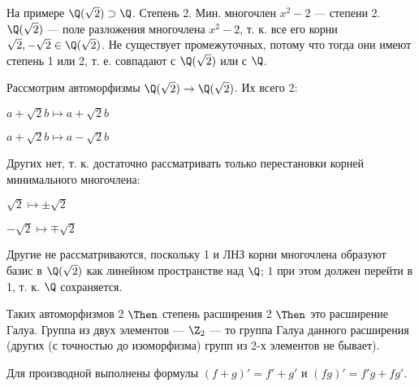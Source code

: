 \begin{solution}
На примере \(\Q(\sqrt{2}) \supset \Q\).
Степень 2. Мин. многочлен \(x^2-2\) --- степени 2.
\(\Q(\sqrt2)\) --- поле разложения многочлена \(x^2-2\), т. к. все его корни \(\sqrt2, -\sqrt2 \in \Q(\sqrt2)\).
Не существует промежуточных, потому что тогда они имеют степень 1 или 2, т. е. совпадают с \(\Q(\sqrt2)\) или с \(\Q\).

Рассмотрим автоморфизмы \(\Q(\sqrt2) \to \Q(\sqrt2)\). Их всего 2:

\(a+\sqrt2b \mapsto a+\sqrt2b\)

\(a+\sqrt2b \mapsto a-\sqrt2b\)

Других нет, т. к. достаточно рассматривать только перестановки корней минимального многочлена:

\(\sqrt2 \mapsto \pm \sqrt2\)

\(-\sqrt2 \mapsto \mp \sqrt2\)

Другие не рассматриваются, поскольку 1 и ЛНЗ корни многочлена образуют базис в \(\Q(\sqrt2)\) как линейном пространстве над \(\Q\); \(1\) при этом должен перейти в 1, т. к. \(\Q\) сохраняется.

Таких автоморфизмов 2 \(\Then\) степень расширения 2 \(\Then\) это расширение Галуа. Группа из двух элементов --- \(\Z_2\) --- то группа Галуа данного расширения (других (с точностью до изоморфизма) групп из 2-х элементов не бывает).
\end{solution}

\begin{problem}[36(9.1)]
Для производной выполнены формулы $(f+g)'=f'+g'$ и $(fg)' = f'g+fg'$.
\end{problem}

